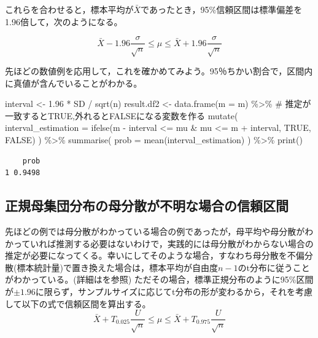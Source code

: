 \documentclass[
  a4paper,
]{ltjsbook}
\newenvironment{Shaded}{\begin{snugshade}}{\end{snugshade}}
\newcommand{\AttributeTok}[1]{\textcolor[rgb]{0.40,0.45,0.13}{#1}}
\newcommand{\CommentTok}[1]{\textcolor[rgb]{0.37,0.37,0.37}{#1}}
\newcommand{\ConstantTok}[1]{\textcolor[rgb]{0.56,0.35,0.01}{#1}}
\newcommand{\FloatTok}[1]{\textcolor[rgb]{0.68,0.00,0.00}{#1}}
\newcommand{\FunctionTok}[1]{\textcolor[rgb]{0.28,0.35,0.67}{#1}}
\newcommand{\NormalTok}[1]{\textcolor[rgb]{0.00,0.23,0.31}{#1}}
\newcommand{\OtherTok}[1]{\textcolor[rgb]{0.00,0.23,0.31}{#1}}
\newcommand{\SpecialCharTok}[1]{\textcolor[rgb]{0.37,0.37,0.37}{#1}}
\begin{document}
これらを合わせると，標本平均が\(\bar{X}\)であったとき，95\%信頼区間は標準偏差を1.96倍して，次のようになる。

\[ \bar{X} - 1.96 \frac{\sigma}{\sqrt{n}} \le \mu \le \bar{X} + 1.96 \frac{\sigma}{\sqrt{n}} \]

先ほどの数値例を応用して，これを確かめてみよう。95％ちかい割合で，区間内に真値が含んでいることがわかる。

\begin{Shaded}
\begin{Highlighting}[]
\NormalTok{interval }\OtherTok{\textless{}{-}} \FloatTok{1.96} \SpecialCharTok{*}\NormalTok{ SD }\SpecialCharTok{/} \FunctionTok{sqrt}\NormalTok{(n)}
\NormalTok{result.df2 }\OtherTok{\textless{}{-}} \FunctionTok{data.frame}\NormalTok{(}\AttributeTok{m =}\NormalTok{ m) }\SpecialCharTok{\%\textgreater{}\%}
  \CommentTok{\# 推定が一致するとTRUE,外れるとFALSEになる変数を作る}
  \FunctionTok{mutate}\NormalTok{(}
    \AttributeTok{interval\_estimation =} \FunctionTok{ifelse}\NormalTok{(m }\SpecialCharTok{{-}}\NormalTok{ interval  }\SpecialCharTok{\textless{}=}\NormalTok{ mu }\SpecialCharTok{\&}\NormalTok{ mu }\SpecialCharTok{\textless{}=}\NormalTok{ m }\SpecialCharTok{+}\NormalTok{ interval, }\ConstantTok{TRUE}\NormalTok{, }\ConstantTok{FALSE}\NormalTok{)}
\NormalTok{  ) }\SpecialCharTok{\%\textgreater{}\%} 
  \FunctionTok{summarise}\NormalTok{(}
    \AttributeTok{prob =} \FunctionTok{mean}\NormalTok{(interval\_estimation)}
\NormalTok{  ) }\SpecialCharTok{\%\textgreater{}\%} \FunctionTok{print}\NormalTok{()}
\end{Highlighting}
\end{Shaded}

\begin{verbatim}
    prob
1 0.9498
\end{verbatim}

\subsection{正規母集団分布の母分散が不明な場合の信頼区間}\label{ux6b63ux898fux6bcdux96c6ux56e3ux5206ux5e03ux306eux6bcdux5206ux6563ux304cux4e0dux660eux306aux5834ux5408ux306eux4fe1ux983cux533aux9593}

先ほどの例では母分散がわかっている場合の例であったが，母平均や母分散がわかっていれば推測する必要はないわけで，実践的には母分散がわからない場合の推定が必要になってくる。幸いにしてそのような場合，すなわち母分散を不偏分散(標本統計量)で置き換えた場合は，標本平均が自由度\(n-1\)のt分布に従うことがわかっている。(詳細は\autocite{kosugi2023}を参照)
ただその場合，標準正規分布のように95\%区間が\(\pm 1.96\)に限らず，サンプルサイズに応じてt分布の形が変わるから，それを考慮して以下の式で信頼区間を算出する。
\[ \bar{X} + T_{0.025}\frac{U}{\sqrt{n}} \le \mu \le \bar{X} + T_{0.975}\frac{U}{\sqrt{n}} \]
\end{document}
